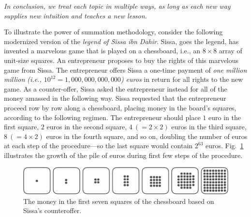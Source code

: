 \medskip

\noindent
{\em In conclusion, we treat each topic in multiple ways, as long as
  each new way supplies new intuition and teaches a new lesson.}

\bigskip





To illustrate the power of summation methodology, consider the
following modernized version of the {\it legend of Sissa ibn Dahir}.
  Sissa, goes the legend, has invented a marvelous game that is played on a chessboard,
i.e., an $8 \times 8$ array of
unit-size squares.  An entrepreneur proposes to buy the rights of this marvelous game from Sissa.
The entrepreneur offers Sissa a one-time payment of {\em one million million (i.e., $10^{12} =
  1,000,000,000,000$) euros} in return for all rights to the new game.  As
a counter-offer, Sissa asked the entrepreneur instead for all of the money
amassed in the following way.  Sissa requested that the entrepreneur proceed row
by row along a chessboard, placing money in the board's squares,
according to the following regimen.  The entrepreneur should place $1$
euro in the first square, $2$ euros in the second square, $4 \ (= 2
\times 2)$ euros in the third square, $8 \ (= 4 \times 2)$ euros in the
fourth square, and so on, doubling the number of euros at each step of the
procedure---so the last square would contain $2^{63}$ euros.
Fig.~\ref{fig:Sissa} illustrates the growth of the pile of euros during first few steps of the procedure.
\begin{figure}[ht]
\begin{center}
       \includegraphics[scale=0.3]{FiguresMaths/chess}
\caption{The money in the first seven squares of the chessboard based on Sissa's counteroffer.}
       \label{fig:Sissa}
\end{center}
\end{figure}

